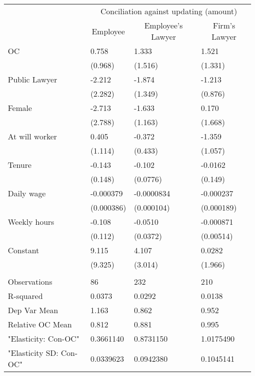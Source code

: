 \begin{tabular}{llll}
      & \multicolumn{3}{c}{Conciliation against updating (amount)} \\
\cmidrule{2-4}      & \multicolumn{1}{c}{Employee} & \multicolumn{1}{c}{Employee's Lawyer} & \multicolumn{1}{c}{Firm's Lawyer} \\
\cmidrule{2-4}OC    & 0.758 & 1.333 & 1.521 \\
      & (0.968) & (1.516) & (1.331) \\
Public Lawyer & -2.212 & -1.874 & -1.213 \\
      & (2.282) & (1.349) & (0.876) \\
Female & -2.713 & -1.633 & 0.170 \\
      & (2.788) & (1.163) & (1.668) \\
At will worker & 0.405 & -0.372 & -1.359 \\
      & (1.114) & (0.433) & (1.057) \\
Tenure & -0.143 & -0.102 & -0.0162 \\
      & (0.148) & (0.0776) & (0.149) \\
Daily wage & -0.000379 & -0.0000834 & -0.000237 \\
      & (0.000386) & (0.000104) & (0.000189) \\
Weekly hours & -0.108 & -0.0510 & -0.000871 \\
      & (0.112) & (0.0372) & (0.00514) \\
Constant & 9.115 & 4.107 & 0.0282 \\
      & (9.325) & (3.014) & (1.966) \\
      &       &       &  \\
\midrule
Observations & 86    & 232   & 210 \\
R-squared & 0.0373 & 0.0292 & 0.0138 \\
Dep Var Mean & 1.163 & 0.862 & 0.952 \\
Relative OC Mean & 0.812 & 0.881 & 0.995 \\
"Elasticity: Con-OC" & 0.3661140 & 0.8731150 & 1.0175490 \\
"Elasticity SD: Con-OC" & 0.0339623 & 0.0942380 & 0.1045141 \\
\bottomrule
\end{tabular}%
